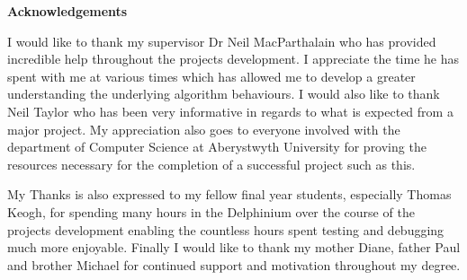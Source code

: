 \thispagestyle{empty}

\begin{center}
    {\LARGE\bf Acknowledgements}
\end{center}
\noident
I would like to thank my supervisor Dr Neil MacParthalain who has provided incredible help throughout the projects development. I appreciate the time he has spent with me at various times which has allowed me to develop a greater understanding the underlying algorithm behaviours. I would also like to thank Neil Taylor who has been very informative in regards to what is expected from a major project. My appreciation also goes to everyone involved with the department of Computer Science at Aberystwyth University for proving the resources necessary for the completion of a successful project such as this.

My Thanks is also expressed to my fellow final year students, especially Thomas Keogh, for spending many hours in the Delphinium over the course of the projects development enabling the countless hours spent testing and debugging much more enjoyable. Finally I would like to thank my mother Diane, father Paul and brother Michael for continued support and motivation throughout my degree.
